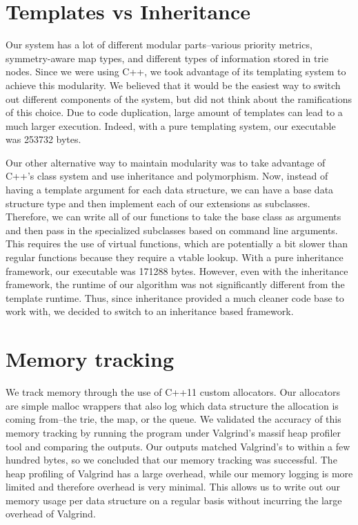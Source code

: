 \documentclass[]{report}
\theoremstyle{definition}
\begin{document}
\section{Templates vs Inheritance}
Our system has a lot of different modular parts--various priority metrics, symmetry-aware map types, and different types of information stored in trie nodes.
Since we were using C++, we took advantage of its templating system to achieve this modularity.
We believed that it would be the easiest way to switch out different components of the system, but did not think about the ramifications of this choice.
Due to code duplication, large amount of templates can lead to a much larger execution.
Indeed, with a pure templating system, our executable was 253732 bytes.

Our other alternative way to maintain modularity was to take advantage of C++'s class system and use inheritance and polymorphism.
Now, instead of having a template argument for each data structure, we can have a base data structure type and then implement each of our extensions as subclasses.
Therefore, we can write all of our functions to take the base class as arguments and then pass in the specialized subclasses based on command line arguments.
This requires the use of virtual functions, which are potentially a bit slower than regular functions because they require a vtable lookup.
With a pure inheritance framework, our executable was 171288 bytes.
However, even with the inheritance framework, the runtime of our algorithm was not significantly different from the template runtime.
Thus, since inheritance provided a much cleaner code base to work with, we decided to switch to an inheritance based framework.

\section{Memory tracking}
We track memory through the use of C++11 custom allocators.
Our allocators are simple malloc wrappers that also log which data structure the allocation is coming from--the trie, the map, or the queue.
We validated the accuracy of this memory tracking by running the program under Valgrind's massif heap profiler tool and comparing the outputs.
Our outputs matched Valgrind's to within a few hundred bytes, so we concluded that our memory tracking was successful.
The heap profiling of Valgrind has a large overhead, while our memory logging is more limited and therefore overhead is very minimal.
This allows us to write out our memory usage per data structure on a regular basis without incurring the large overhead of Valgrind.
\end{document}

